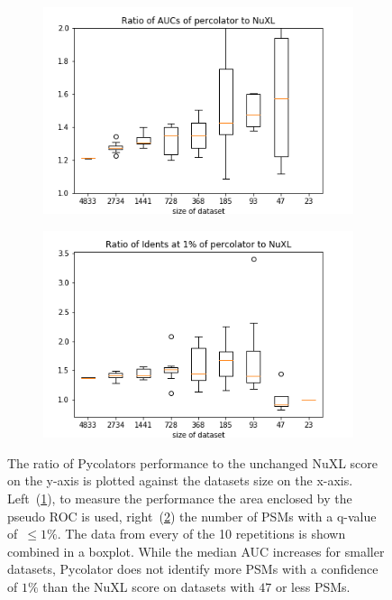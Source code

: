 \begin{figure}
	\normalsize
	\centering
	\begin{subfigure}{0.49 \textwidth}
		\includegraphics[width = \textwidth]{figures/auc_performance.png}
		\caption{}
		\label{fig:results:small_dataset_snd_comparison_auc}
	\end{subfigure}
	\hfill
	\begin{subfigure}{0.49 \textwidth}
		\includegraphics[width = \textwidth]{figures/idents_performance.png}
		\caption{}
		\label{fig:results:small_dataset_snd_comparison_idents}
	\end{subfigure}
	\caption[Performance of Pycolator on smaller datasets]{The ratio of Pycolators performance to the unchanged NuXL score on the y-axis is plotted against the datasets size on the x-axis. Left~(\ref{fig:results:small_dataset_snd_comparison_auc}), to measure the performance the area enclosed by the pseudo ROC is used, right~(\ref{fig:results:small_dataset_snd_comparison_idents}) the number of PSMs with a q-value of~$\leq1\%$. The data from every of the 10 repetitions is shown combined in a boxplot. While the median AUC increases for smaller datasets, Pycolator does not identify more PSMs with a confidence of $1\%$ than the NuXL score on datasets with $47$ or less PSMs.}
	\label{fig:results:small_dataset_snd_comparison}
\end{figure}
\renewcommand{\baselinestretch}{1}
	